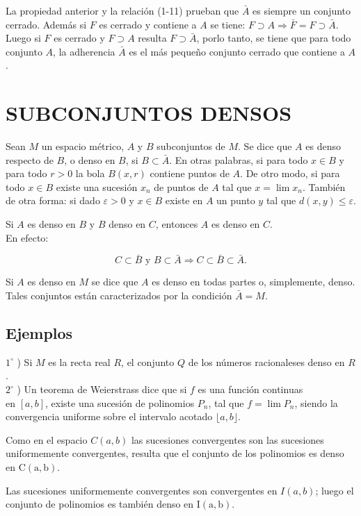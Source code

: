 \documentclass[10pt]{article}
\theoremstyle{plain}
\theoremstyle{definition}
\theoremstyle{remark}
\begin{document}
La propiedad anterior y la relación (1-11) prueban que $\bar{A}$ es siempre un conjunto cerrado. Además si $F$ es cerrado y contiene a $A$ se tiene: $F \supset A \Rightarrow \bar{F}=F \supset \bar{A}$. Luego si $F$ es cerrado y $F \supset A$ resulta $F \supset \bar{A}$, porlo tanto, se tiene que para todo conjunto $A$, la adherencia $\bar{A}$ es el más pequeño conjunto cerrado que contiene a $A$.

\section*{SUBCONJUNTOS DENSOS}
Sean $M$ un espacio métrico, $A$ y $B$ subconjuntos de $M$. Se dice que $A$ es denso respecto de $B$, o denso en $B$, si $B \subset \bar{A}$. En otras palabras, si para todo $x \in B$ y para todo $r>0$ la bola $B(x, r)$ contiene puntos de $A$. De otro modo, si para todo $x \in B$ existe una sucesión $x_{n}$ de puntos de $A$ tal que $x=\lim x_{n}$. También de otra forma: si dado $\varepsilon>0$ y $x \in B$ existe en $A$ un punto $y$ tal que $d(x, y) \leqslant \varepsilon$.

Si $A$ es denso en $B$ y $B$ denso en $C$, entonces $A$ es denso en $C$.\\
En efecto:

$$
C \subset \bar{B} \text { y } B \subset \bar{A} \Rightarrow C \subset \bar{B} \subset \bar{A} .
$$

Si $A$ es denso en $M$ se dice que $A$ es denso en todas partes o, simplemente, denso. Tales conjuntos están caracterizados por la condición $\bar{A}=M$.

\subsection*{Ejemplos}
$1^{\circ}$ ) Si $M$ es la recta real $R$, el conjunto $Q$ de los números racionaleses denso en $R$.\\
$2^{\circ}$ ) Un teorema de Weierstrass dice que si $f$ es una función continuas\\
en $[a, b]$, existe una sucesión de polinomios $P_{n}$, tal que $f=\lim P_{n}$, siendo la convergencia uniforme sobre el intervalo acotado $\lfloor a, b\rfloor$.

Como en el espacio $C(a, b)$ las sucesiones convergentes son las sucesiones uniformemente convergentes, resulta que el conjunto de los polinomios es denso en $\mathrm{C}(\mathrm{a}, \mathrm{b})$.

Las sucesiones uniformemente convergentes son convergentes en $I(a, b)$; luego el conjunto de polinomios es también denso en $\mathrm{I}(\mathrm{a}, \mathrm{b})$.
\end{document}
